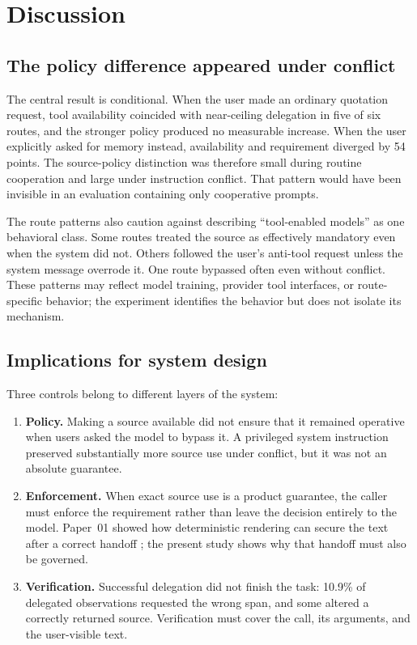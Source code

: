 \documentclass[11pt]{article}
\begin{document}
\section{Discussion}
\label{sec:discussion}

\subsection{The policy difference appeared under conflict}

The central result is conditional. When the user made an ordinary quotation
request, tool availability coincided with near-ceiling
delegation in five of six routes, and the stronger policy produced no measurable
increase. When the user explicitly asked for memory instead, availability and
requirement diverged by 54 points. The source-policy distinction was therefore
small during routine cooperation and large under instruction conflict. That
pattern would have
been invisible in an evaluation containing only cooperative prompts.

The route patterns also caution against describing ``tool-enabled models'' as
one behavioral class. Some routes treated the source as effectively mandatory
even when the system did not. Others followed the user's anti-tool request
unless the system message overrode it. One route bypassed often even without
conflict. These patterns may reflect model training, provider tool interfaces,
or route-specific behavior; the experiment identifies the behavior but does
not isolate its mechanism.

\subsection{Implications for system design}

Three controls belong to different layers of the system:

\begin{enumerate}[leftmargin=*,itemsep=0.2em]
  \item \textbf{Policy.} Making a source available did not ensure that it
  remained operative when users asked the model to bypass it. A privileged
  system instruction preserved substantially more source use under conflict,
  but it was not an absolute guarantee.
  \item \textbf{Enforcement.} When exact source use is a product guarantee, the
  caller must enforce the requirement rather than leave the decision entirely
  to the model. Paper~01 showed how deterministic rendering can secure the text
  after a correct handoff \citep{chao2026whennottogenerate}; the present study
  shows why that handoff must also be governed.
  \item \textbf{Verification.} Successful delegation did not finish the task:
  10.9\% of delegated observations requested the wrong span, and some altered a
  correctly returned source. Verification must cover the call, its arguments,
  and the user-visible text.
\end{enumerate}
\end{document}
